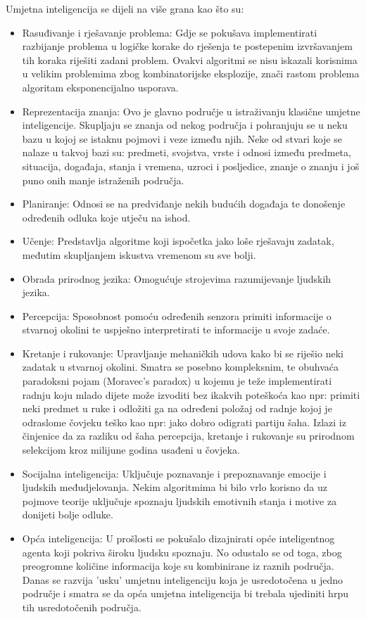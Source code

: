 Umjetna inteligencija se dijeli na više grana kao što su:
\begin{itemize}
	\item Rasuđivanje i rješavanje problema: Gdje se pokušava implementirati razbijanje problema u logičke korake do rješenja te postepenim izvršavanjem tih koraka riješiti zadani problem. Ovakvi algoritmi se nisu iskazali korisnima u velikim problemima zbog kombinatorijske eksplozije, znači rastom problema algoritam eksponencijalno usporava.
	
	\item Reprezentacija znanja: Ovo je glavno područje u istraživanju klasične umjetne inteligencije. Skupljaju se znanja od nekog područja i pohranjuju se u neku bazu u kojoj se istaknu pojmovi i veze između njih. Neke od stvari koje se nalaze u takvoj bazi su: predmeti, svojstva, vrste i odnosi između predmeta, situacija, događaja, stanja i vremena, uzroci i posljedice, znanje o znanju i još puno onih manje istraženih područja.
	
	\item Planiranje: Odnosi se na predviđanje nekih budućih događaja te donošenje određenih odluka koje utječu na ishod.
	
	\item Učenje: Predstavlja algoritme koji ispočetka jako loše rješavaju zadatak, međutim skupljanjem iskustva vremenom su sve bolji.
	
	\item Obrada prirodnog jezika: Omogućuje strojevima razumijevanje ljudskih jezika.
	
	\item Percepcija: Sposobnost pomoću određenih senzora primiti informacije o stvarnoj okolini te uspješno interpretirati te informacije u svoje zadaće.
	
	\item Kretanje i rukovanje: Upravljanje mehaničkih udova kako bi se riješio neki zadatak u stvarnoj okolini. Smatra se posebno kompleksnim, te obuhvaća paradoksni pojam (Moravec's paradox) u kojemu je teže implementirati radnju koju mlado dijete može izvoditi bez ikakvih poteškoća kao npr: primiti neki predmet u ruke i odložiti ga na određeni položaj od radnje kojoj je odraslome čovjeku teško kao npr: jako dobro odigrati partiju šaha. Izlazi iz činjenice da za razliku od šaha percepcija, kretanje i rukovanje su prirodnom selekcijom kroz milijune godina usađeni u čovjeka.
	
	\item Socijalna inteligencija: Uključuje poznavanje i prepoznavanje emocije i ljudskih međudjelovanja. Nekim algoritmima bi bilo vrlo korisno da uz pojmove teorije uključuje spoznaju ljudskih emotivnih stanja i motive za donijeti bolje odluke.
	
	\item Opća inteligencija: U prošlosti se pokušalo dizajnirati opće inteligentnog agenta koji pokriva široku ljudsku spoznaju. No odustalo se od toga, zbog preogromne količine informacija koje su kombinirane iz raznih područja. Danas se razvija 'usku' umjetnu inteligenciju koja je usredotočena u jedno područje i smatra se da opća umjetna inteligencija bi trebala ujediniti hrpu tih usredotočenih područja.
\end{itemize}

